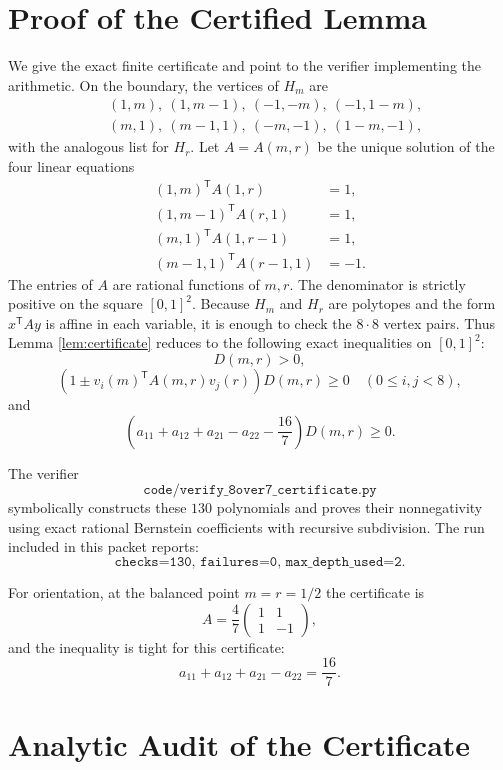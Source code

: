 \documentclass[11pt]{article}
\begin{document}
\section*{Proof of the Certified Lemma}

We give the exact finite certificate and point to the verifier implementing the
arithmetic.  On the boundary, the vertices of \(H_m\) are
\[
\begin{aligned}
&(1,m),\ (1,m-1),\ (-1,-m),\ (-1,1-m),\\
&(m,1),\ (m-1,1),\ (-m,-1),\ (1-m,-1),
\end{aligned}
\]
with the analogous list for \(H_r\).  Let \(A=A(m,r)\) be the unique solution
of the four linear equations
\[
\begin{aligned}
(1,m)^\mathsf{T}A(1,r)&=1,\\
(1,m-1)^\mathsf{T}A(r,1)&=1,\\
(m,1)^\mathsf{T}A(1,r-1)&=1,\\
(m-1,1)^\mathsf{T}A(r-1,1)&=-1.
\end{aligned}
\]
The entries of \(A\) are rational functions of \(m,r\).  The denominator is
strictly positive on the square \([0,1]^2\).  Because \(H_m\) and \(H_r\) are
polytopes and the form \(x^\mathsf{T}Ay\) is affine in each variable, it is
enough to check the \(8\cdot8\) vertex pairs.  Thus Lemma
\ref{lem:certificate} reduces to the following exact inequalities on
\([0,1]^2\):
\[
D(m,r)>0,
\]
\[
(1\pm v_i(m)^\mathsf{T}A(m,r)v_j(r))D(m,r)\geq0
\quad(0\leq i,j<8),
\]
and
\[
\left(a_{11}+a_{12}+a_{21}-a_{22}-\frac{16}{7}\right)D(m,r)\geq0.
\]

The verifier
\[
\texttt{code/verify\_8over7\_certificate.py}
\]
symbolically constructs these \(130\) polynomials and proves their
nonnegativity using exact rational Bernstein coefficients with recursive
subdivision.  The run included in this packet reports:
\[
\texttt{checks=130,\ failures=0,\ max\_depth\_used=2.}
\]

For orientation, at the balanced point \(m=r=1/2\) the certificate is
\[
A=\frac47
\begin{pmatrix}
1&1\\
1&-1
\end{pmatrix},
\]
and the inequality is tight for this certificate:
\[
a_{11}+a_{12}+a_{21}-a_{22}=\frac{16}{7}.
\]

\section*{Analytic Audit of the Certificate}
\end{document}
